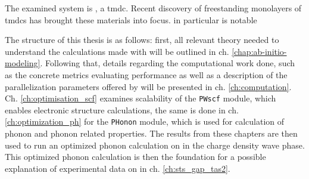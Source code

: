 \documentclass[main.tex]{subfiles}
\begin{document}
The examined system is \TaS, a \acrfull{tmdc}.
Recent discovery of freestanding monolayers of \acrshort{tmdc}s \cite{novoselov_two-dimensional_2005} has brought these materials into focus.
\TaS in particular is notable 

The structure of this thesis is as follows:
first, all relevant theory needed to understand the calculations made with \QE will be outlined in ch. \ref{chap:ab-initio-modeling}.
Following that, details regarding the computational work done, such as the concrete metrics evaluating performance as well as a description of the parallelization parameters offered by \QE will be presented in ch. \ref{ch:computation}.
Ch. \ref{ch:optimisation_scf} examines scalability of the \texttt{PWscf} module, which enables electronic structure calculations, the same is done in ch. \ref{ch:optimization_ph} for the \texttt{PHonon} module, which is used for calculation of phonon and phonon related properties. 
The results from these chapters are then used to run an optimized phonon calculation on \TaS in the charge density wave phase.
This optimized phonon calculation is then the foundation for a possible explanation of experimental data on \TaS in ch. \ref{ch:sts_gap_tas2}.
\end{document}
